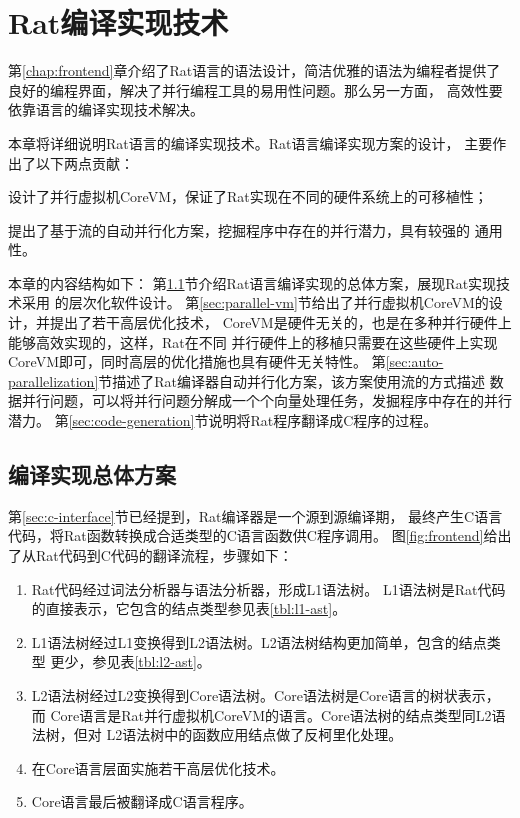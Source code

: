 \chapter{Rat编译实现技术}\label{chap:compiler}
第\ref{chap:frontend}章介绍了Rat语言的语法设计，简洁优雅的语法为编程者提供了
良好的编程界面，解决了并行编程工具的易用性问题。那么另一方面，
高效性要依靠语言的编译实现技术解决。

本章将详细说明Rat语言的编译实现技术。Rat语言编译实现方案的设计，
主要作出了以下两点贡献：
\begin{compactitem}
  \item 设计了并行虚拟机CoreVM，保证了Rat实现在不同的硬件系统上的可移植性；
  \item 提出了基于流的自动并行化方案，挖掘程序中存在的并行潜力，具有较强的
    通用性。
\end{compactitem}

本章的内容结构如下：
第\ref{sec:compiler-overview}节介绍Rat语言编译实现的总体方案，展现Rat实现技术采用
的层次化软件设计。
第\ref{sec:parallel-vm}节给出了并行虚拟机CoreVM的设计，并提出了若干高层优化技术，
CoreVM是硬件无关的，也是在多种并行硬件上能够高效实现的，这样，Rat在不同
并行硬件上的移植只需要在这些硬件上实现CoreVM即可，同时高层的优化措施也具有硬件无关特性。
第\ref{sec:auto-parallelization}节描述了Rat编译器自动并行化方案，该方案使用流的方式描述
数据并行问题，可以将并行问题分解成一个个向量处理任务，发掘程序中存在的并行潜力。
第\ref{sec:code-generation}节说明将Rat程序翻译成C程序的过程。

\section{编译实现总体方案}\label{sec:compiler-overview}
第\ref{sec:c-interface}节已经提到，Rat编译器是一个源到源编译期，
最终产生C语言代码，将Rat函数转换成合适类型的C语言函数供C程序调用。
图\ref{fig:frontend}给出了从Rat代码到C代码的翻译流程，步骤如下：
\begin{enumerate}
  \item Rat代码经过词法分析器与语法分析器，形成L1语法树。
    L1语法树是Rat代码的直接表示，它包含的结点类型参见表\ref{tbl:l1-ast}。
  \item L1语法树经过L1变换得到L2语法树。L2语法树结构更加简单，包含的结点类型
    更少，参见表\ref{tbl:l2-ast}。
  \item L2语法树经过L2变换得到Core语法树。Core语法树是Core语言的树状表示，而
    Core语言是Rat并行虚拟机CoreVM的语言。Core语法树的结点类型同L2语法树，但对
    L2语法树中的函数应用结点做了反柯里化处理。
  \item 在Core语言层面实施若干高层优化技术。
  \item Core语言最后被翻译成C语言程序。
\end{enumerate}

